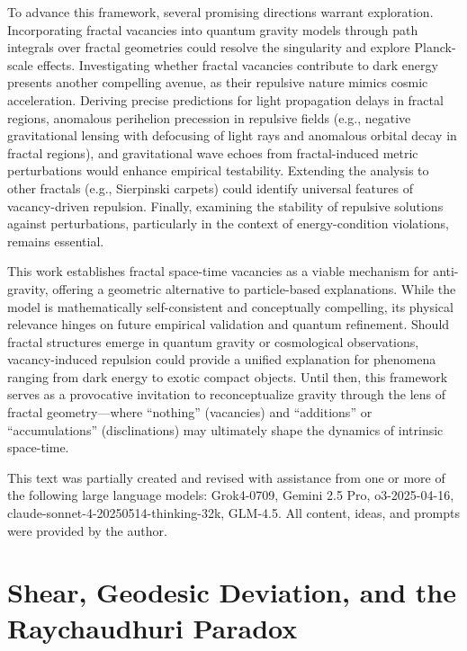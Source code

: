 \documentclass[%
  reprint,
  superscriptaddress,
  showpacs,
  showkeys,
  amsmath,amssymb,
  pra,
  longbibliography,
  floatfix,
]{revtex4-2}
\begin{document}
To advance this framework, several promising directions warrant exploration.
Incorporating fractal vacancies into quantum gravity models through path integrals
over fractal geometries could resolve the singularity and explore Planck-scale effects.
Investigating whether fractal vacancies contribute to dark energy presents another compelling avenue,
as their repulsive nature mimics cosmic acceleration.
Deriving precise predictions for light propagation delays in fractal regions,
anomalous perihelion precession in repulsive fields (e.g., negative gravitational lensing with defocusing of light rays and anomalous orbital decay in fractal regions),
and gravitational wave echoes from fractal-induced metric perturbations would enhance empirical testability.
Extending the analysis to other fractals (e.g., Sierpinski carpets) could identify universal features of vacancy-driven repulsion.
Finally, examining the stability of repulsive solutions against perturbations, particularly in the context of energy-condition violations, remains essential.

This work establishes fractal space-time vacancies as a viable mechanism for anti-gravity,
offering a geometric alternative to particle-based explanations.
 While the model is mathematically self-consistent and conceptually compelling,
its physical relevance hinges on future empirical validation and quantum refinement.
Should fractal structures emerge in quantum gravity or cosmological observations,
vacancy-induced repulsion could provide a unified explanation for phenomena ranging from dark energy to exotic compact objects.
Until then, this framework serves as a provocative invitation to reconceptualize gravity
through the lens of fractal geometry---where ``nothing'' (vacancies) and ``additions'' or ``accumulations'' (disclinations) may ultimately shape the dynamics of intrinsic space-time.

\begin{acknowledgments}
This text was partially created and revised with assistance from one or more of the following large language models: Grok4-0709, Gemini 2.5 Pro, o3-2025-04-16, claude-sonnet-4-20250514-thinking-32k, GLM-4.5. All content, ideas, and prompts were provided by the author.
\end{acknowledgments}



\appendix

\section{Shear, Geodesic Deviation, and the Raychaudhuri Paradox}
\label{app:shear}
\end{document}
